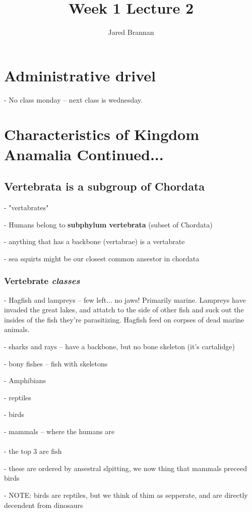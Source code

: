 \documentclass{article}
\title{Week 1 Lecture 2}
\author{Jared Brannan }
\theoremstyle{definition}
\begin{document}
\maketitle

\section{Administrative drivel}
- No class monday -- next class is wednesday.

\section{Characteristics of Kingdom Anamalia Continued...}
\subsection{Vertebrata is a subgroup of Chordata}
- "vertabrates"

- Humans belong to \textbf{subphylum vertebrata} (subset of Chordata)

- anything that has a backbone (vertabrae) is a vertabrate

- sea squirts might be our closest common ansestor in chordata

\subsubsection{Vertebrate \textit{classes}}

- Hagfish and lampreys -- few left... no jaws! Primarily marine. Lampreys have invaded the great lakes, and attatch to the side of other fish and suck out the insides of the fish they're parasitizing. Hagfish feed on corpses of dead marine animals.

- sharks and rays -- have a backbone, but no bone skeleton (it's cartalidge)

- bony fishes  -- fish with skeletons

- Amphibians

- reptiles

- birds 

- mammals -- where the humans are\\~\\

- the top 3 are fish

- these are ordered by ansestral slpitting, we now thing that mammals preceed birds

- NOTE: birds are reptiles, but we think of thim as sepperate, and are directly decendent from dinosaurs
\end{document}
